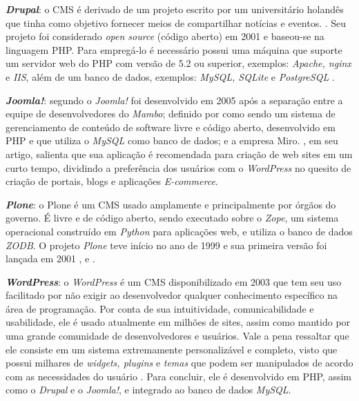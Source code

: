 \textbf{\textit{Drupal}}: o CMS é derivado de um projeto escrito por um universitário holandês que tinha como objetivo fornecer meios de compartilhar notícias e eventos. . Seu projeto foi considerado \textit{open source} (código aberto) em 2001 e baseou-se na linguagem PHP. Para empregá-lo é necessário possui uma máquina que suporte um servidor web do PHP com versão de 5.2 ou superior, exemplos: \textit{Apache, nginx} e \textit{IIS}, além de um banco de dados, exemplos: \textit{MySQL, SQLite} e \textit{PostgreSQL} . 

\textbf{\textit{Joomla!}}: segundo  o \textit{Joomla!} foi desenvolvido em 2005 após a separação entre a equipe de desenvolvedores do \textit{Mambo}; definido por  como sendo um sistema de gerenciamento de conteúdo de software livre e código aberto, desenvolvido em PHP e que utiliza o \textit{MySQL} como banco de dados; e a empresa Miro. , em seu artigo, salienta que sua aplicação é recomendada para criação de web sites em um curto tempo, dividindo a preferência dos usuários com o \textit{WordPress} no quesito de criação de portais, blogs e aplicações \textit{E-commerce}.

\textbf{\textit{Plone}}: o Plone é um CMS usado amplamente e principalmente por órgãos do governo. É livre e de código aberto, sendo executado sobre o \textit{Zope}, um sistema operacional construído em \textit{Python} para aplicações web, e utiliza o banco de dados \textit{ZODB}. O projeto \textit{Plone} teve início no ano de 1999 e sua primeira versão foi lançada em 2001 ,  e .


\textbf{\textit{WordPress}}: o \textit{WordPress} é um CMS disponibilizado em 2003 que tem seu uso facilitado por não exigir ao desenvolvedor qualquer conhecimento específico na área de programação. Por conta de sua intuitividade, comunicabilidade e usabilidade, ele é usado atualmente em milhões de sites, assim como mantido por uma grande comunidade de desenvolvedores e usuários. Vale a pena ressaltar que ele consiste em um sistema extremamente personalizável e completo, visto que possui milhares de \textit{widgets, plugins} e \textit{temas} que podem ser manipulados de acordo com as necessidades do usuário . Para concluir, ele é desenvolvido em PHP, assim como o \textit{Drupal} e o \textit{Joomla!}, e integrado ao banco de dados \textit{MySQL}. 

